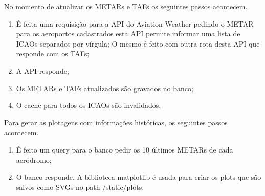 No momento de atualizar os METARs e TAFs os seguintes passos acontecem.

\begin{enumerate}
\item É feita uma requisição para a API do Aviation Weather pedindo o METAR para os aeroportos
cadastrados esta API permite informar uma lista de ICAOs separados por vírgula;
O mesmo é feito com outra rota desta API que responde com os TAFs;
\item A API responde;
\item Os METARs e TAFs atualizados são gravados no banco;
\item O cache para todos os ICAOs são invalidados.
\end{enumerate}

Para gerar as plotagens com informações históricas, os seguintes passos acontecem.
\begin{enumerate}
    \item É feito um query para o banco pedir os 10 últimos METARs de cada aeródromo;
    \item O banco responde. A biblioteca matplotlib é usada para criar os plots que são salvos como SVGs 
    no path /static/plots.
\end{enumerate}